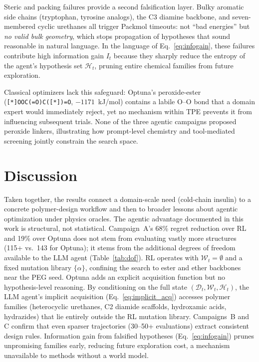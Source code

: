 \documentclass[twocolumn]{fairmeta}
\begin{document}
Steric and packing failures provide a second falsification layer.
Bulky aromatic side chains (tryptophan, tyrosine analogs), the C3 diamine backbone, and seven-membered cyclic urethanes all trigger Packmol timeouts: not ``bad energies'' but \emph{no valid bulk geometry}, which stops propagation of hypotheses that sound reasonable in natural language.
In the language of Eq.~\ref{eq:infogain}, these failures contribute high information gain $I_t$ because they sharply reduce the entropy of the agent's hypothesis set $\mathcal{H}_t$, pruning entire chemical families from future exploration.

Classical optimizers lack this safeguard: Optuna's peroxide-ester (\texttt{[*]OOC(=O)C([*])=O}, $-1171$~kJ/mol) contains a labile O--O bond that a domain expert would immediately reject, yet no mechanism within TPE prevents it from influencing subsequent trials.
None of the three agentic campaigns proposed peroxide linkers, illustrating how prompt-level chemistry and tool-mediated screening jointly constrain the search space.

\section{Discussion}

Taken together, the results connect a domain-scale need (cold-chain insulin) to a concrete polymer-design workflow and then to broader lessons about agentic optimization under physics oracles.
The agentic advantage documented in this work is structural, not statistical.
Campaign~A's 68\% regret reduction over RL and 19\% over Optuna does not stem from evaluating vastly more structures (115+ vs.\ 143 for Optuna); it stems from the additional degrees of freedom available to the LLM agent (Table~\ref{tab:dof}).
RL operates with $\mathcal{W}_t = \emptyset$ and a fixed mutation library $\{\alpha\}$, confining the search to ester and ether backbones near the PEG seed.
Optuna adds an explicit acquisition function but no hypothesis-level reasoning.
By conditioning on the full state $(\mathcal{D}_t, \mathcal{W}_t, \mathcal{H}_t)$, the LLM agent's implicit acquisition (Eq.~\ref{eq:implicit_acq}) accesses polymer families (heterocyclic urethanes, C2 diamide scaffolds, hydroxamic acids, hydrazides) that lie entirely outside the RL mutation library.
Campaigns~B and C confirm that even sparser trajectories (30--50+ evaluations) extract consistent design rules.
Information gain from falsified hypotheses (Eq.~\ref{eq:infogain}) prunes unpromising families early, reducing future exploration cost, a mechanism unavailable to methods without a world model.
\end{document}
